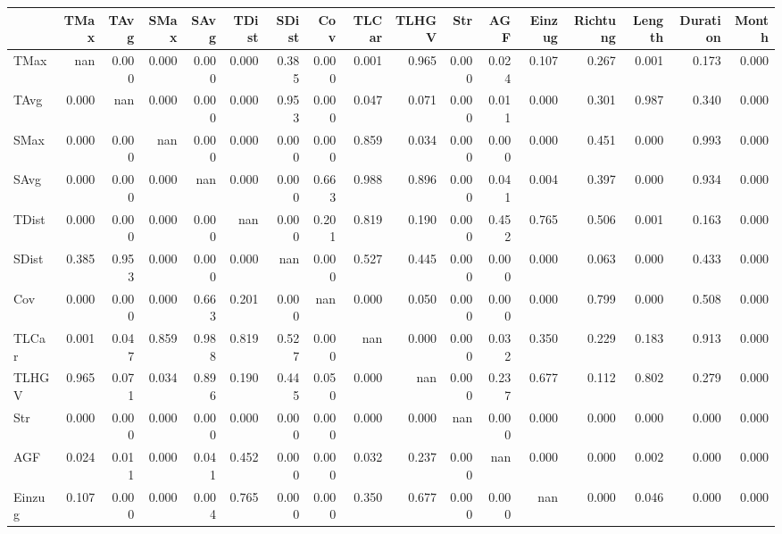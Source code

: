 \begin{tabular}{lrrrrrrrrrrrrrrrr}
\toprule
{} &  TMax &  TAvg &  SMax &  SAvg &  TDist &  SDist &   Cov &  TLCar &  TLHGV &   Str &   AGF &  Einzug &  Richtung &  Length &  Duration &  Month \\
\midrule
TMax     &   nan & 0.000 & 0.000 & 0.000 &  0.000 &  0.385 & 0.000 &  0.001 &  0.965 & 0.000 & 0.024 &   0.107 &     0.267 &   0.001 &     0.173 &  0.000 \\
TAvg     & 0.000 &   nan & 0.000 & 0.000 &  0.000 &  0.953 & 0.000 &  0.047 &  0.071 & 0.000 & 0.011 &   0.000 &     0.301 &   0.987 &     0.340 &  0.000 \\
SMax     & 0.000 & 0.000 &   nan & 0.000 &  0.000 &  0.000 & 0.000 &  0.859 &  0.034 & 0.000 & 0.000 &   0.000 &     0.451 &   0.000 &     0.993 &  0.000 \\
SAvg     & 0.000 & 0.000 & 0.000 &   nan &  0.000 &  0.000 & 0.663 &  0.988 &  0.896 & 0.000 & 0.041 &   0.004 &     0.397 &   0.000 &     0.934 &  0.000 \\
TDist    & 0.000 & 0.000 & 0.000 & 0.000 &    nan &  0.000 & 0.201 &  0.819 &  0.190 & 0.000 & 0.452 &   0.765 &     0.506 &   0.001 &     0.163 &  0.000 \\
SDist    & 0.385 & 0.953 & 0.000 & 0.000 &  0.000 &    nan & 0.000 &  0.527 &  0.445 & 0.000 & 0.000 &   0.000 &     0.063 &   0.000 &     0.433 &  0.000 \\
Cov      & 0.000 & 0.000 & 0.000 & 0.663 &  0.201 &  0.000 &   nan &  0.000 &  0.050 & 0.000 & 0.000 &   0.000 &     0.799 &   0.000 &     0.508 &  0.000 \\
TLCar    & 0.001 & 0.047 & 0.859 & 0.988 &  0.819 &  0.527 & 0.000 &    nan &  0.000 & 0.000 & 0.032 &   0.350 &     0.229 &   0.183 &     0.913 &  0.000 \\
TLHGV    & 0.965 & 0.071 & 0.034 & 0.896 &  0.190 &  0.445 & 0.050 &  0.000 &    nan & 0.000 & 0.237 &   0.677 &     0.112 &   0.802 &     0.279 &  0.000 \\
Str      & 0.000 & 0.000 & 0.000 & 0.000 &  0.000 &  0.000 & 0.000 &  0.000 &  0.000 &   nan & 0.000 &   0.000 &     0.000 &   0.000 &     0.000 &  0.000 \\
AGF      & 0.024 & 0.011 & 0.000 & 0.041 &  0.452 &  0.000 & 0.000 &  0.032 &  0.237 & 0.000 &   nan &   0.000 &     0.000 &   0.002 &     0.000 &  0.000 \\
Einzug   & 0.107 & 0.000 & 0.000 & 0.004 &  0.765 &  0.000 & 0.000 &  0.350 &  0.677 & 0.000 & 0.000 &     nan &     0.000 &   0.046 &     0.000 &  0.000 \\

\end{tabular}
